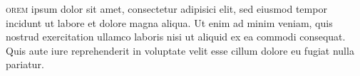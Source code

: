 \documentclass[oneside, 11pt]{memoir}
\begin{document}
\lettrine[lines=3]{\gothfamily\fontsize{50}{60}\scalebox{2}{L}}{orem}  ipsum dolor sit amet, consectetur adipisici elit, sed eiusmod tempor incidunt ut labore et dolore magna aliqua. Ut enim ad minim veniam, quis nostrud exercitation ullamco laboris nisi ut aliquid ex ea commodi consequat. Quis aute iure reprehenderit in voluptate velit esse cillum dolore eu fugiat nulla pariatur. 
\end{document}
